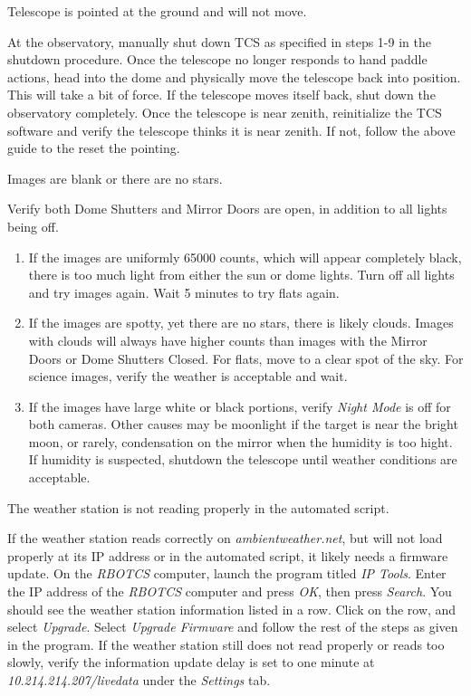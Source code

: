 \documentclass[letterpaper,12pt]{article}
\begin{document}
\begin{shaded}\centering
	Telescope is pointed at the ground and will not move.
\end{shaded}\noindent
At the observatory, manually shut down TCS as specified in steps 1-9 in the shutdown procedure. Once the telescope no longer responds to hand paddle actions, head into the dome and physically move the telescope back into position. This will take a bit of force. If the telescope moves itself back, shut down the observatory completely. Once the telescope is near zenith, reinitialize the TCS software and verify the telescope thinks it is near zenith. If not, follow the above guide to the reset the pointing.


\begin{shaded}\centering
	Images are blank or there are no stars.
\end{shaded}\noindent
Verify both Dome Shutters and Mirror Doors are open, in addition to all lights being off.
\begin{enumerate}
\item If the images are uniformly 65000 counts, which will appear completely black, there is too much light from either the sun or dome lights. Turn off all lights and try images again. Wait 5 minutes to try flats again.
\item If the images are spotty, yet there are no stars, there is likely clouds. Images with clouds will always have higher counts than images with the Mirror Doors or Dome Shutters Closed. For flats, move to a clear spot of the sky. For science images, verify the weather is acceptable and wait.
\item If the images have large white or black portions, verify \textit{Night Mode} is off for both cameras. Other causes may be moonlight if the target is near the bright moon, or rarely, condensation on the mirror when the humidity is too hight. If humidity is suspected, shutdown the telescope until weather conditions are acceptable.
\end{enumerate}

\begin{shaded}\centering
	The weather station is not reading properly in the automated script.
\end{shaded}\noindent
If the weather station reads correctly on \textit{ambientweather.net}, but will not load properly at its IP address or in the automated script, it likely needs a firmware update. On the \textit{RBOTCS} computer, launch the program titled \textit{IP Tools}. Enter the IP address of the \textit{RBOTCS} computer and press \textit{OK}, then press \textit{Search}. You should see the weather station information listed in a row. Click on the row, and select \textit{Upgrade}. Select \textit{Upgrade Firmware} and follow the rest of the steps as given in the program. If the weather station still does not read properly or reads too slowly, verify the information update delay is set to one minute at \textit{10.214.214.207/livedata} under the \textit{Settings} tab.
\end{document}
